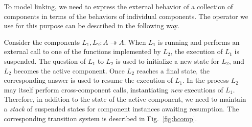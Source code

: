\documentclass[acmsmall,screen,review,anonymous]{acmart}
\begin{document}
To model linking,
we need to express the external behavior
of a collection of components
in terms of the behaviors of
individual components.
The operator we use for this purpose
can be described in the following way.

Consider the components $L_1, L_2 : A \twoheadrightarrow A$.
When $L_1$ is running and performs an external call
to one of the functions implemented by $L_2$,
the execution of $L_1$ is suspended.
The question of $L_1$ to $L_2$
is used to initialize a new state for $L_2$,
and $L_2$ becomes the active component.
Once $L_2$ reaches a final state,
the corresponding answer is used to resume
the execution of $L_1$.
In the process
$L_2$ may itself perform cross-component calls,
instantiating \emph{new} executions of $L_1$.
Therefore,
in addition to the state of the active component,
we need to maintain a \emph{stack} of suspended states
for component instances awaiting resumption.
The corresponding transition system
is described in Fig.~\ref{fig:hcomp}.
\end{document}
